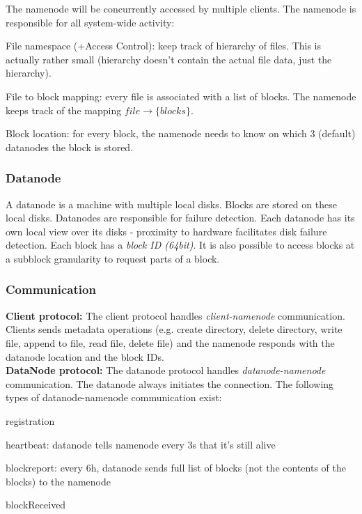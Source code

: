\documentclass[11pt,oneside,a4paper]{article}
\begin{document}
The namenode will be concurrently accessed by multiple clients. The namenode is responsible for all system-wide activity:

\begin{compactitem}
	\item File namespace (+Access Control): keep track of hierarchy of files. This is actually rather small (hierarchy doesn't contain the actual file data, just the hierarchy).
	\item File to block mapping: every file is associated with a list of blocks. The namenode keeps track of the mapping $file \rightarrow \{blocks\}$.
	\item Block location: for every block, the namenode needs to know on which 3 (default) datanodes the block is stored.
\end{compactitem}

\subsubsection{Datanode}

A datanode is a machine with multiple local disks. Blocks are stored on these local disks. Datanodes are responsible for failure detection. Each datanode has its own local view over its disks - proximity to hardware facilitates disk failure detection. Each block has a \textit{block ID (64bit)}. It is also possible to access blocks at a subblock granularity to request parts of a block.

\subsubsection{Communication}

\textbf{Client protocol:} The client protocol handles \textit{client-namenode} communication. Clients sends metadata operations (e.g. create directory, delete directory, write file, append to file, read file,
delete file) and the namenode responds with the datanode location and the block IDs.\\

\textbf{DataNode protocol:} The datanode protocol handles \textit{datanode-namenode} communication. The datanode always initiates the connection. The following types of datanode-namenode communication exist:

\begin{compactitem}
	\item registration
	\item heartbeat: datanode tells namenode every 3s that it's still alive
	\item blockreport: every 6h, datanode sends full list of blocks (not the contents of the blocks) to the namenode
	\item blockReceived\\
\end{compactitem}
\end{document}
